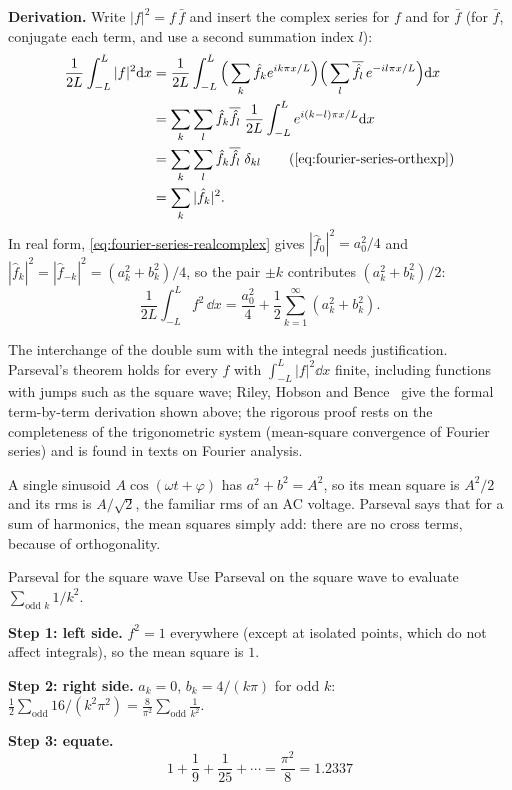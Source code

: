 \textbf{Derivation.} Write $|f|^2=f\,\bar f$ and insert the complex series for $f$ and for $\bar f$ (for $\bar f$, conjugate each term, and use a second summation index $l$):
\begin{align}
\frac1{2L}\int_{-L}^{L}|f|^2\dd x
&=\frac1{2L}\int_{-L}^{L}\Big(\sum_k\hat f_ke^{ik\pi x/L}\Big)\Big(\sum_l\overline{\hat f_l}\,e^{-il\pi x/L}\Big)\dd x\\
&=\sum_k\sum_l\hat f_k\overline{\hat f_l}\;\frac1{2L}\int_{-L}^{L}e^{i(k-l)\pi x/L}\dd x\\
&=\sum_k\sum_l\hat f_k\overline{\hat f_l}\;\delta_{kl}\qquad\text{(\cref{eq:fourier-series-orthexp})}\\
&=\sum_k|\hat f_k|^2 .
\label{eq:fourier-series-parseval}
\end{align}
In real form, \cref{eq:fourier-series-realcomplex} gives $|\hat f_0|^2=a_0^2/4$ and $|\hat f_k|^2=|\hat f_{-k}|^2=(a_k^2+b_k^2)/4$, so the pair $\pm k$ contributes $(a_k^2+b_k^2)/2$:
\begin{equation}
\frac1{2L}\int_{-L}^{L}f^2\,\dd x=\frac{a_0^2}{4}+\frac12\sum_{k=1}^{\infty}\left(a_k^2+b_k^2\right).
\label{eq:fourier-series-parsevalreal}
\end{equation}

\begin{beyond}
The interchange of the double sum with the integral needs justification. Parseval's theorem holds for every $f$ with $\int_{-L}^{L}|f|^2\dd x$ finite, including functions with jumps such as the square wave; Riley, Hobson and Bence~\cite{rhb} give the formal term-by-term derivation shown above; the rigorous proof rests on the completeness of the trigonometric system (mean-square convergence of Fourier series) and is found in texts on Fourier analysis.
\end{beyond}

A single sinusoid $A\cos(\omega t+\varphi)$ has $a^2+b^2=A^2$, so its mean square is $A^2/2$ and its rms is $A/\sqrt2$, the familiar rms of an AC voltage. Parseval says that for a sum of harmonics, the mean squares simply add: there are no cross terms, because of orthogonality.

\begin{sample}{Parseval for the square wave}
Use Parseval on the square wave to evaluate $\sum_{\text{odd }k}1/k^2$.

\textbf{Step 1: left side.} $f^2=1$ everywhere (except at isolated points, which do not affect integrals), so the mean square is $1$.

\textbf{Step 2: right side.} $a_k=0$, $b_k=4/(k\pi)$ for odd $k$: $\frac12\sum_{\text{odd}}16/(k^2\pi^2)=\frac{8}{\pi^2}\sum_{\text{odd}}\frac1{k^2}$.

\textbf{Step 3: equate.}
\[
\boxed{1+\frac1{9}+\frac1{25}+\cdots=\frac{\pi^2}{8}=1.2337}
\]
\end{sample}

